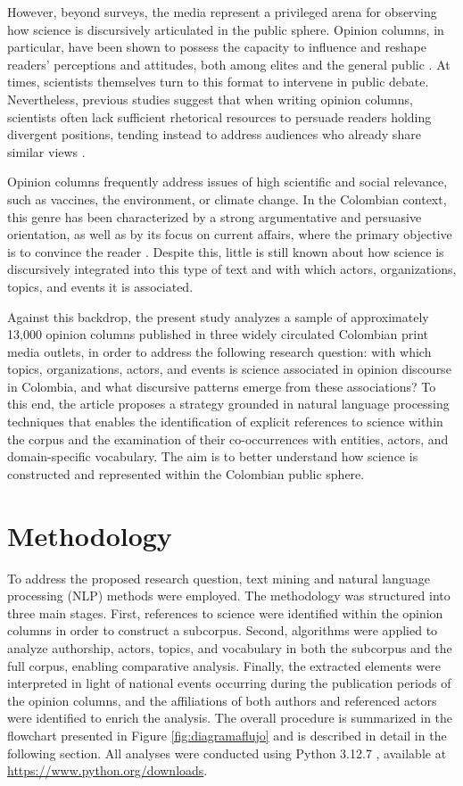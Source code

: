 \documentclass[11pt,a4paper]{article}
\begin{document}
	However, beyond surveys, the media represent a privileged arena for observing how science is discursively articulated in the public sphere. Opinion columns, in particular, have been shown to possess the capacity to influence and reshape readers’ perceptions and attitudes, both among elites and the general public \cite{Coppock2018}. At times, scientists themselves turn to this format to intervene in public debate. Nevertheless, previous studies suggest that when writing opinion columns, scientists often lack sufficient rhetorical resources to persuade readers holding divergent positions, tending instead to address audiences who already share similar views \cite{Syfert2025}.
	
	Opinion columns frequently address issues of high scientific and social relevance, such as vaccines, the environment, or climate change. In the Colombian context, this genre has been characterized by a strong argumentative and persuasive orientation, as well as by its focus on current affairs, where the primary objective is to convince the reader \cite{CaroLopera2020}. Despite this, little is still known about how science is discursively integrated into this type of text and with which actors, organizations, topics, and events it is associated.
	

	Against this backdrop, the present study analyzes a sample of approximately 13,000 opinion columns published in three widely circulated Colombian print media outlets, in order to address the following research question: with which topics, organizations, actors, and events is science associated in opinion discourse in Colombia, and what discursive patterns emerge from these associations? To this end, the article proposes a strategy grounded in natural language processing techniques that enables the identification of explicit references to science within the corpus and the examination of their co-occurrences with entities, actors, and domain-specific vocabulary. The aim is to better understand how science is constructed and represented within the Colombian public sphere.
	
	\section{Methodology}
	
	To address the proposed research question, text mining and natural language processing (NLP) methods were employed. The methodology was structured into three main stages. First, references to science were identified within the opinion columns in order to construct a subcorpus. Second, algorithms were applied to analyze authorship, actors, topics, and vocabulary in both the subcorpus and the full corpus, enabling comparative analysis. Finally, the extracted elements were interpreted in light of national events occurring during the publication periods of the opinion columns, and the affiliations of both authors and referenced actors were identified to enrich the analysis. The overall procedure is summarized in the flowchart presented in Figure \ref{fig:diagramaflujo} and is described in detail in the following section. All analyses were conducted using Python 3.12.7 \cite{python3127}, available at \url{https://www.python.org/downloads}.
	
\end{document}
